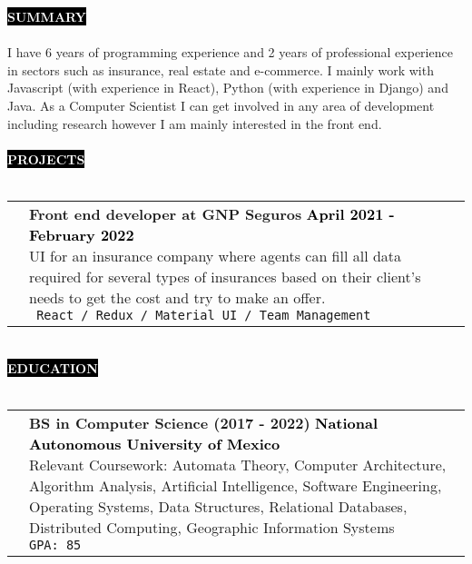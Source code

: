 \documentclass[11pt,A4]{article}
\makeatletter
\newcounter{a}
\newcounter{b}
\newcounter{c}
\newcommand{\cvsection}[1] {
	\textcolor{white}{\MakeUppercase{\textbf{#1}}}
}
\newcommand{\cvsect}[1]{
	\colorbox{black}{{\cvsection{#1}}}\\\\%
}
\newenvironment{entrylist}{%
	\begin{tabular*}{\textwidth}[t]{@{\extracolsep{\fill}}ll}
	}{%
	\end{tabular*}
}
\newcommand{\entry}[5]{%
	&\parbox[t]{17.5cm}{%
		\large\textbf{#1}%
		\hfill
		{\small \textbf{\textcolor{black}{#2}}}\\%
		\normalsize #4\\
		\texttt{#5}
	}\\\\}
\newcommand{\slashsep}{
	\hspace{2mm}/\hspace{2mm}
}
\makeatother
\begin{document}
	\cvsect{Summary}
	\normalsize I have 6 years of programming experience and 2 years of professional experience in sectors such as insurance, real estate and e-commerce. I mainly work with Javascript (with experience in React), Python (with experience in Django) and Java. As a Computer Scientist I can get involved in any area of development including research however I am mainly interested in the front end. \\
	\\
	\cvsect{Projects}
	\begin{entrylist}
		\entry
		{Front end developer at GNP Seguros}
		{April 2021 - February 2022}
		{GNP Seguros}
		{UI for an insurance company where agents can fill all data required for several types of insurances based on their client's needs to get the cost and try to make an offer.}
		{ React \slashsep Redux \slashsep Material UI \slashsep Team Management}
		\entry
		{Full stack developer at M22}
		{October 2020 - February 2021}
		{M22}
		{UI for a real estate company where people can view details and availability of several places for make purchase agreement. All the data updates in real time and the content is modified from a Content Management System(CMS).}
		{React \slashsep Strapi JS \slashsep QGIS \slashsep GraphQL}
		\entry
		{Full stack developer at Ultra maratón sierra mixe}
		{January 2020 - September 2020}
		{Ultra maratón sierra mixe}
		{This is a client's project on the automation of the processes involved in the realization of a marathon race such as registration, marketing and payment.}
		{React \slashsep Nextjs}
		\entry
		{Full stack developer}
		{Summer 2018}
		{Copnap}
		{Mobile application for Android to help teachers and students to know if a number is prime or not, also the app can give you the list of prime numbers in a range and calculate the Euler's totient function.}
		{Flutter \slashsep Dart}
	\end{entrylist}
	\\
	\cvsect{Education}
	\begin{entrylist}
		\entry
		{BS in Computer Science (\small 2017 - 2022)}
		{National Autonomous University of Mexico }
		{UNAM, Faculty of Science}
		{Relevant Coursework: Automata Theory, Computer Architecture, Algorithm Analysis, Artificial Intelligence, Software Engineering, Operating Systems, Data Structures, Relational Databases, Distributed Computing, Geographic Information Systems} 
		{GPA: 85}
	\end{entrylist}
	\\
\end{document}
